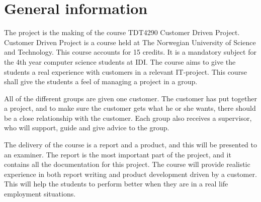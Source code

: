 \section{General information}

The project is the making of the course TDT4290 Customer Driven Project. 
Customer Driven Project is a course held at The Norwegian University of Science and Technology.
This course accounts for 15 credits. 
It is a mandatory subject for the 4th year computer science students at IDI. 
The course aims to give the students a real experience with customers in a relevant IT-project. 
This course shall give the students a feel of managing a project in a group. 


All of the different groups are given one customer. 
The customer has put together a project, and to make sure the customer gets what he or she wants, there should be a close relationship with the customer.
Each group also receives a supervisor, who will support, guide and give advice to the group. 

The delivery of the course is a report and a product, and this will be presented to an examiner. 
The report is the most important part of the project, and it contains all the documentation for this project. The course will provide realistic experience in both report writing and product development driven by a customer. 
This will help the students to perform better when they are in a real life employment situations.


